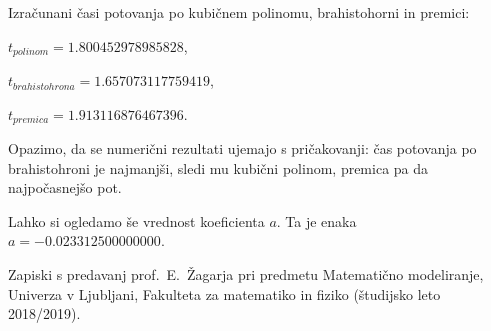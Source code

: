 \documentclass[a4paper]{article}
\begin{document}
Izračunani časi potovanja po kubičnem polinomu, brahistohorni in premici:

$t_{polinom} = 1.800452978985828$,

$t_{brahistohrona} = 1.657073117759419$,

$t_{premica} = 1.913116876467396$.

Opazimo, da se numerični rezultati ujemajo s pričakovanji: čas potovanja po brahistohroni je najmanjši, sledi mu kubični polinom, premica pa da najpočasnejšo pot.

Lahko si ogledamo še vrednost koeficienta $a$. Ta je enaka $a = -0.023312500000000$.


\begin{thebibliography}{99}

 Zapiski s predavanj prof.~E.~Žagarja pri predmetu Matematično modeliranje, Univerza v Ljubljani, Fakulteta za matematiko in fiziko (študijsko leto 2018/2019).

\end{thebibliography}
\end{document}
